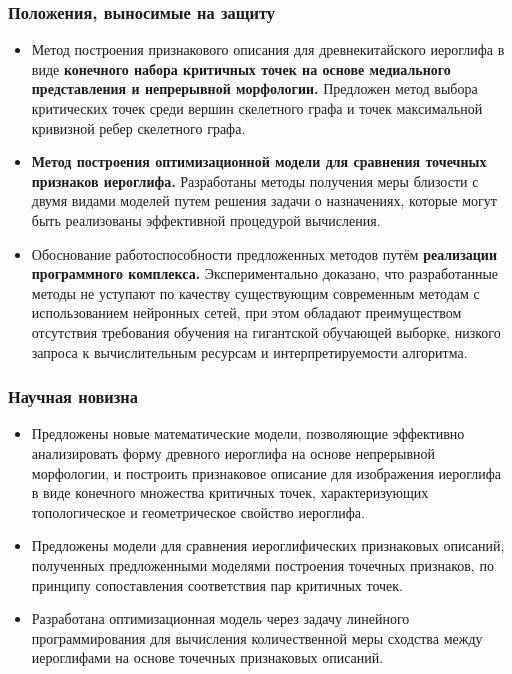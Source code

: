\begin{frame}
    \frametitle{Положения, выносимые на защиту}
    \begin{itemize}
        \item Метод построения признакового описания для древнекитайского иероглифа в виде \textbf{конечного набора критичных точек на основе медиального представления и непрерывной морфологии.} Предложен метод выбора критических точек среди вершин скелетного графа и точек максимальной кривизной ребер скелетного графа.
        \item \textbf{Метод построения оптимизационной модели для сравнения точечных признаков иероглифа.} Разработаны методы получения меры близости с двумя видами моделей путем решения задачи о назначениях, которые могут быть реализованы эффективной процедурой вычисления.
        \item Обоснование работоспособности предложенных методов путём \textbf{реализации программного комплекса.} Экспериментально доказано, что разработанные методы не уступают по качеству существующим современным методам с использованием нейронных сетей, при этом обладают преимуществом отсутствия требования обучения на гигантской обучающей выборке, низкого запроса к вычислительным ресурсам и интерпретируемости алгоритма.
    \end{itemize}
\end{frame}

\begin{frame}
    \frametitle{Научная новизна}
    \begin{itemize}
        \item Предложены новые математические модели, позволяющие эффективно анализировать форму древного иероглифа на основе непрерывной морфологии, и построить признаковое описание для изображения иероглифа в виде конечного множества критичных точек, характеризующих топологическое и геометрическое свойство иероглифа.
        \item Предложены модели для сравнения иероглифических признаковых описаний, полученных предложенными моделями построения точечных признаков, по принципу сопоставления соответствия пар критичных точек.
        \item Разработана оптимизационная модель через задачу линейного программирования для вычисления количественной меры сходства между иероглифами на основе точечных признаковых описаний.
    \end{itemize}
\end{frame}

